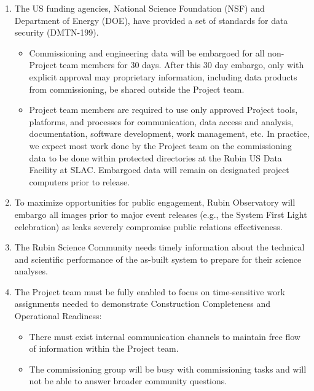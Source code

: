 \documentclass[SE,authoryear,toc,lsstdraft]{lsstdoc}
\begin{document}
\begin{enumerate}

  \item The US funding agencies, National Science Foundation (NSF) and Department of Energy (DOE), have provided a set of standards for data security (DMTN-199).

  \begin{itemize}

    \item Commissioning and engineering data will be embargoed for all non-Project team members for 30 days.
    After this 30 day embargo, only with explicit approval may proprietary information, including data products from commissioning, be shared outside the Project team.

    \item Project team members are required to use only approved Project tools, platforms, and processes for communication, data access and analysis, documentation, software development, work management, etc.
    In practice, we expect most work done by the Project team on the commissioning data to be done within protected directories at the Rubin US Data Facility at SLAC.
    Embargoed data will remain on designated project computers prior to release.

  \end{itemize}

  \item To maximize opportunities for public engagement, Rubin Observatory will embargo all images prior to major event releases (e.g., the System First Light celebration) as leaks severely compromise public relations effectiveness.

  \item The Rubin Science Community needs timely information about the technical and scientific performance of the as-built system to prepare for their science analyses.

  \item The Project team must be fully enabled to focus on time-sensitive work assignments needed to demonstrate Construction Completeness and Operational Readiness:

  \begin{itemize}

    \item There must exist internal communication channels to maintain free flow of information within the Project team.

    \item The commissioning group will be busy with commissioning tasks and will not be able to answer broader community questions.

  \end{itemize}

\end{enumerate}
\end{document}
